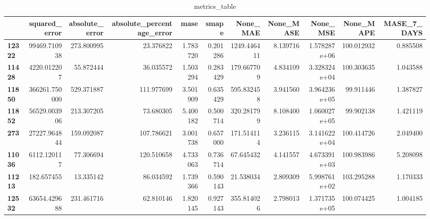 \begin{table}[h]
\centering
\caption{metrics_table}
\label{table:Experiment with CNN AE and LSTM hybrid method. Global, multivariate, dataset seasonal. Tuned with LSTM Global multivariate dataset seasonal}
\begin{tabular}{lrrrrrrrrrr}
\toprule
{} &  squared\_error &  absolute\_error &  absolute\_percentage\_error &      mase &     smape &     None\_MAE &  None\_MASE &      None\_MSE &   None\_MAPE &  MASE\_7\_DAYS \\
\midrule
\textbf{12322} &   99469.710938 &      273.800995 &                  23.376822 &  1.783720 &  0.201286 &  1249.446411 &   8.139716 &  1.578287e+06 &  100.012932 &     0.885508 \\
\textbf{11428} &    4220.012207 &       55.872444 &                  36.035572 &  1.503294 &  0.283429 &   179.667709 &   4.834109 &  3.328324e+04 &  100.303635 &     1.043588 \\
\textbf{11850} &  366261.750000 &      529.371887 &                 111.977699 &  3.501909 &  0.635429 &   595.832458 &   3.941560 &  3.964236e+05 &   99.911446 &     1.387827 \\
\textbf{11852} &   56529.003906 &      213.307205 &                  73.680305 &  5.400182 &  0.500714 &   320.281799 &   8.108400 &  1.060027e+05 &   99.902138 &     1.421119 \\
\textbf{273  } &   27227.964844 &      159.092087 &                 107.786621 &  3.001738 &  0.657000 &   171.514114 &   3.236115 &  3.141622e+04 &  100.414726 &     2.049400 \\
\textbf{11036} &    6112.120117 &       77.306694 &                 120.510658 &  4.733063 &  0.736714 &    67.645432 &   4.141557 &  4.673391e+03 &  100.983986 &     5.208098 \\
\textbf{11213} &     182.657455 &       13.335142 &                  86.034592 &  1.739366 &  0.590143 &    21.538034 &   2.809309 &  5.998761e+02 &  103.295288 &     1.170333 \\
\textbf{12532} &   63654.429688 &      231.461716 &                  62.810146 &  1.820145 &  0.927143 &   355.814026 &   2.798013 &  1.371735e+05 &  100.074425 &     1.004185 \\
\bottomrule
\end{tabular}
\end{table}

